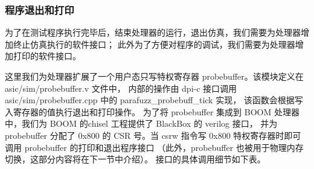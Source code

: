 \subsubsection{程序退出和打印}
为了在测试程序执行完毕后，结束处理器的运行，退出仿真，我们需要为处理器增加终止仿真执行的软件接口；
此外为了方便对程序的调试，我们需要为处理器增加打印的软件接口。\par

这里我们为处理器扩展了一个用户态只写特权寄存器 probebuffer。该模块定义在 asic/sim/probebuffer.v 文件中，
内部的操作由 dpi-c 接口调用 asic/sim/probebuffer.cpp 中的 parafuzz\_probebuff\_tick 实现，
该函数会根据写入寄存器的值执行退出和打印操作。
为了将 probebuffer 集成到 BOOM 处理器中，我们为 BOOM 的chisel 工程提供了 BlackBox 的 verilog 接口，
并为 probebuffer 分配了 0x800 的 CSR 号。当 csrw 指令写 0x800 特权寄存器时即可调用 probebuffer 的打印和退出程序接口
（此外，probebuffer 也被用于物理内存切换，这部分内容将在下一节中介绍）。
接口的具体调用细节如下表。\par

\begin{table}[h!]
    \begin{center} 
    \caption{probebuffer 软件接口} 
    \label{table:probebuffer}  
    \end{center}
\end{table}

